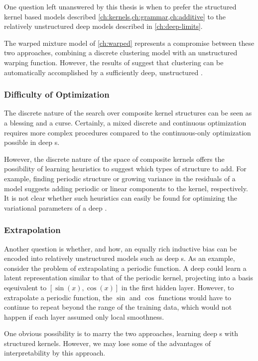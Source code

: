 One question left unanswered by this thesis is when to prefer the structured kernel based models described \cref{ch:kernels,ch:grammar,ch:additive} to the relatively unstructured deep \gp{} models described in \cref{ch:deep-limits}.

The warped mixture model of \cref{ch:warped} represents a compromise between these two approaches, combining a discrete clustering model with an unstructured warping function.
However, the results of \citet{damianou2012deep} suggest that clustering can be automatically accomplished by a sufficiently deep, unstructured \gp{}.

\subsubsection{Difficulty of Optimization}
The discrete nature of the search over composite kernel structures can be seen as a blessing and a curse.
Certainly, a mixed discrete and continuous optimization requires more complex procedures compared to the continuous-only optimization possible in deep \gp{}s.

However, the discrete nature of the space of composite kernels offers the possibility of learning heuristics to suggest which types of structure to add.
For example, finding periodic structure or growing variance in the residuals of a model suggests adding periodic or linear components to the kernel, respectively.
It is not clear whether such heuristics can easily be found for optimizing the variational parameters of a deep \gp{}.

\subsubsection{Extrapolation}
Another question is whether, and how, an equally rich inductive bias can be encoded into relatively unstructured models such as deep \gp{}s.
As an example, consider the problem of extrapolating a periodic function.
A deep \gp{} could learn a latent representation similar to that of the periodic kernel, projecting into a basis eqeuivalent to $[\sin(x), \cos(x)]$ in the first hidden layer.
However, to extrapolate a periodic function, the $\sin$ and $\cos$ functions would have to continue to repeat beyond the range of the training data, which would not happen if each layer assumed only local smoothness.

One obvious possibility is to marry the two approaches, learning deep \gp{}s with structured kernels.
However, we may lose some of the advantages of interpretability by this approach.


